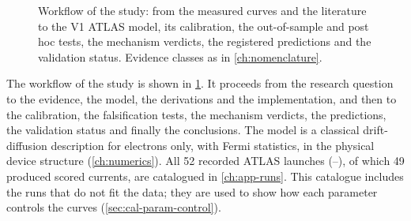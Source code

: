 \begin{figure}[tbp]
  \centering
  \caption{Workflow of the study: from the measured curves and the literature to the V1 ATLAS model, its calibration, the out-of-sample and post hoc tests, the mechanism verdicts, the registered predictions and the validation status. Evidence classes as in \cref{ch:nomenclature}.}
  \label{fig:intro-workflow}
\end{figure}

The workflow of the study is shown in \cref{fig:intro-workflow}. It proceeds from the research question to the evidence, the model, the derivations and the implementation, and then to the calibration, the falsification tests, the mechanism verdicts, the predictions, the validation status and finally the conclusions. The model is a classical drift-diffusion description for electrons only, with Fermi statistics, in the physical device structure (\cref{ch:numerics}). All 52 recorded ATLAS launches (--), of which 49 produced scored currents, are catalogued in \cref{ch:app-runs}. This catalogue includes the runs that do not fit the data; they are used to show how each parameter controls the curves (\cref{sec:cal-param-control}).

